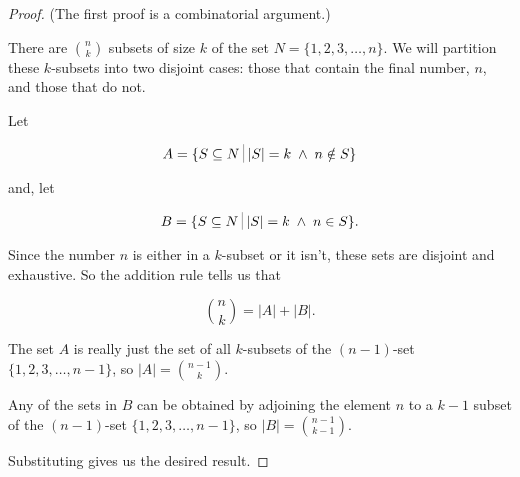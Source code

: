 \begin{proof} 
(The first proof is a combinatorial argument.)

There are $\binom{n}{k}$ subsets of size $k$ of the set $N = \{1, 2, 3, \ldots, n\}$.
We will partition these $k$-subsets into two disjoint cases: those that contain
the final number, $n$, and those that do not.

Let 

\[ A = \{ S \subseteq N \suchthat |S| = k \; \land \; n \notin S \} \]

\noindent and, let

\[ B = \{ S \subseteq N \suchthat |S| = k \; \land \; n \in S \}. \]

Since the number $n$ is either in a $k$-subset or it isn't, these sets
are disjoint and exhaustive.  So the addition rule tells us that

\[ \binom{n}{k} = |A| + |B|. \]

The set $A$ is really just the set of all $k$-subsets of the $(n-1)$-set
$\{1, 2, 3, \ldots, n-1 \}$, so $|A| = \binom{n-1}{k}$.

Any of the sets in $B$ can be obtained by adjoining the element $n$ to
a $k-1$ subset of the  $(n-1)$-set
$\{1, 2, 3, \ldots, n-1 \}$, so $|B| = \binom{n-1}{k-1}$.

Substituting gives us the desired result.
\end{proof}

